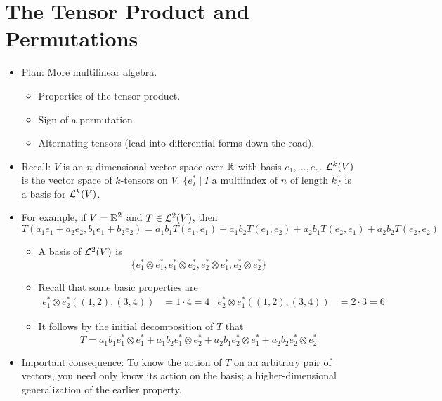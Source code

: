 \documentclass[../notes.tex]{subfiles}
\begin{document}
\section{The Tensor Product and Permutations}
\begin{itemize}
    \item {}Plan: More multilinear algebra.
    \begin{itemize}
        \item Properties of the tensor product.
        \item Sign of a permutation.
        \item Alternating tensors (lead into differential forms down the road).
    \end{itemize}
    \item Recall: $V$ is an $n$-dimensional vector space over $\R$ with basis $e_1,\dots,e_n$. $\lin[k]{V}$ is the vector space of $k$-tensors on $V$. $\{e_I^*\mid I\text{ a multiindex of }n\text{ of length }k\}$ is a basis for $\lin[k]{V}$.
    \item For example, if $V=\R^2$ and $T\in\lin[2]{V}$, then
    \begin{equation*}
        T(a_1e_1+a_2e_2,b_1e_1+b_2e_2) = a_1b_1T(e_1,e_1)+a_1b_2T(e_1,e_2)+a_2b_1T(e_2,e_1)+a_2b_2T(e_2,e_2)
    \end{equation*}
    \begin{itemize}
        \item A basis of $\lin[2]{V}$ is
        \begin{equation*}
            \{e_1^*\otimes e_1^*,e_1^*\otimes e_2^*,e_2^*\otimes e_1^*,e_2^*\otimes e_2^*\}
        \end{equation*}
        \item Recall that some basic properties are
        \begin{align*}
            e_1^*\otimes e_2^*((1,2),(3,4)) &= 1\cdot 4 = 4&
            e_2^*\otimes e_1^*((1,2),(3,4)) &= 2\cdot 3 = 6
        \end{align*}
        \item It follows by the initial decomposition of $T$ that
        \begin{equation*}
            T = a_1b_1e_1^*\otimes e_1^*+a_1b_2e_1^*\otimes e_2^*+a_2b_1e_2^*\otimes e_1^*+a_2b_2e_2^*\otimes e_2^*
        \end{equation*}
    \end{itemize}
    \item Important consequence: To know the action of $T$ on an arbitrary pair of vectors, you need only know its action on the basis; a higher-dimensional generalization of the earlier property.

\end{itemize}
\end{document}
